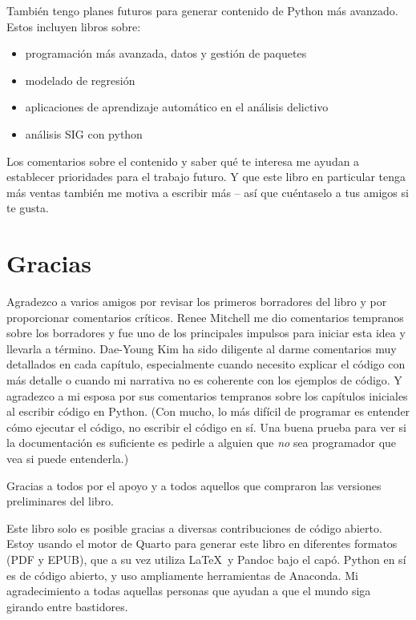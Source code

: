 \documentclass[
  letterpaper,
]{scrbook}
\providecommand{\tightlist}{%
  \setlength{\itemsep}{0pt}\setlength{\parskip}{0pt}}\usepackage{longtable,booktabs,array}
\begin{document}
También tengo planes futuros para generar contenido de Python más
avanzado. Estos incluyen libros sobre:

\begin{itemize}
\tightlist
\item
  programación más avanzada, datos y gestión de paquetes
\item
  modelado de regresión
\item
  aplicaciones de aprendizaje automático en el análisis delictivo
\item
  análisis SIG con python
\end{itemize}

Los comentarios sobre el contenido y saber qué te interesa me ayudan a
establecer prioridades para el trabajo futuro. Y que este libro en
particular tenga más ventas también me motiva a escribir más -- así que
cuéntaselo a tus amigos si te gusta.

\section*{Gracias}\label{gracias}


Agradezco a varios amigos por revisar los primeros borradores del libro
y por proporcionar comentarios críticos. Renee Mitchell me dio
comentarios tempranos sobre los borradores y fue uno de los principales
impulsos para iniciar esta idea y llevarla a término. Dae-Young Kim ha
sido diligente al darme comentarios muy detallados en cada capítulo,
especialmente cuando necesito explicar el código con más detalle o
cuando mi narrativa no es coherente con los ejemplos de código. Y
agradezco a mi esposa por sus comentarios tempranos sobre los capítulos
iniciales al escribir código en Python. (Con mucho, lo más difícil de
programar es entender cómo ejecutar el código, no escribir el código en
sí. Una buena prueba para ver si la documentación es suficiente es
pedirle a alguien que \emph{no} sea programador que vea si puede
entenderla.)

Gracias a todos por el apoyo y a todos aquellos que compraron las
versiones preliminares del libro.

Este libro solo es posible gracias a diversas contribuciones de código
abierto. Estoy usando el motor de Quarto para generar este libro en
diferentes formatos (PDF y EPUB), que a su vez utiliza \LaTeX~y Pandoc
bajo el capó. Python en sí es de código abierto, y uso ampliamente
herramientas de Anaconda. Mi agradecimiento a todas aquellas personas
que ayudan a que el mundo siga girando entre bastidores.
\end{document}

